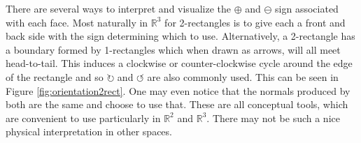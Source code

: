 \begin{figure}[ht]
\end{figure}

There are several ways to interpret and visualize the $\oplus$ and $\ominus$ sign associated with each face.
Most naturally in $\mathbb{R}^3$ for 2-rectangles is to give each a front and back side with the sign determining which to use.
Alternatively, a 2-rectangle has a boundary formed by 1-rectangles which when drawn as arrows, will all meet head-to-tail.
This induces a clockwise or counter-clockwise cycle around the edge of the rectangle and so $\circlearrowright$ and $\circlearrowleft$ are also commonly used.
This can be seen in Figure \ref{fig:orientation2rect}.
One may even notice that the normals produced by both are the same and choose to use that.
These are all conceptual tools, which are convenient to use particularly in $\mathbb{R}^2$ and $\mathbb{R}^3$.
There may not be such a nice physical interpretation in other spaces.


